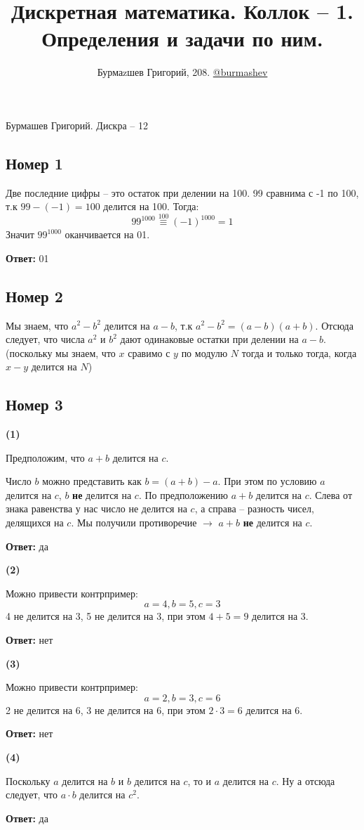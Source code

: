 \documentclass[a4paper,12pt]{article}
\author{Бурмаzшев Григорий, 208. \href{https://teleg.run/burmashev}{@burmashev}}
\title{Дискретная математика. Коллок -- 1. Определения и задачи по ним.}
\begin{document}
\begin{center}
Бурмашев Григорий. Дискра -- 12
\end{center}
\subsection*{Номер 1}
Две последние цифры -- это остаток при делении на 100. 99 сравнима с -1 по 100, т.к $99 - (-1) = 100$ делится на 100. Тогда:
\[
99^{1000} \stackrel{100}{\equiv}(-1)^{1000}  = 1
\]
Значит $99^{1000}$ оканчивается на 01.
\begin{center}
\textbf{Ответ:} 01
\end{center}
\subsection*{Номер 2}
Мы знаем, что $a^2 - b^2$ делится на $a - b$, т.к $a^2 - b^2 = (a-b)(a+b)$.  Отсюда следует, что числа $a^2$ и $b^2$ дают одинаковые остатки при делении на $ a - b $. (поскольку мы знаем, что $x$ сравимо с $y$ по модулю $N$ тогда и только тогда, когда $x - y$ делится на $N$)
\newpage  
\subsection*{Номер 3}
\textbf{(1)}

Предположим, что $a+b$ делится на $c$.


Число $b$ можно представить как $b = (a + b) - a$. При этом по условию $a$ делится на $c$, $b$ \textbf{не} делится на $c$. По предположению $ a + b$ делится на $c$.  Слева от знака равенства у нас число не делится на $c$, а справа -- разность чисел, делящихся на $c$. Мы получили противоречие $\rightarrow$ $a+ b$ \textbf{не} делится на $c$.
\begin{center}
\textbf{Ответ:} да
\end{center}
\textbf{(2)}

Можно привести контрпример:
\[
a = 4, b = 5, c = 3
\]
4 не делится на 3, 5 не делится на 3, при этом $4 + 5 = 9$ делится на 3.
\begin{center}
\textbf{Ответ:} нет
\end{center}
\textbf{(3)}

Можно привести контрпример:
\[
a = 2, b = 3, c = 6
\]
2 не делится на 6, 3 не делится на 6, при этом $2 \cdot 3 = 6$ делится на 6.
\begin{center}
\textbf{Ответ:} нет
\end{center}
\textbf{(4)}

Поскольку $a$ делится на $b$ и $b$ делится на $c$, то и $a$ делится на $c$. Ну а отсюда следует, что $a \cdot b$ делится на $c^2$.
\begin{center}
\textbf{Ответ:} да
\end{center}
\end{document}
